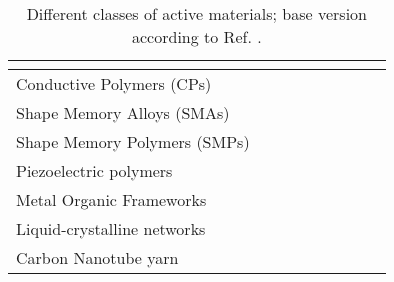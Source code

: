 \documentclass{article}
\begin{document}
\begin{landscape}
\begin{table}[htbp]
\begin{tabular}{|p{3.4cm}|p{1.5cm}|p{1.5cm}|p{1.5cm}|p{1.5cm}|p{1.5cm}|p{1.5cm}|p{1.5cm}|p{1.5cm}|}
			&  \cellcolor{myLightGray} \cite{Maehlich2023jimss,Li2019,Zari2024,Suzuki1990,Kim2010,Truong2018,Sumaru2006}
			&  \cellcolor{myLightGray} \cite{Leichsenring2017,EsserKahn2008,Li2005} 
			&  \cellcolor{myLightGray} \cite{Pu2024,Herrmann2021,Pedrosa2011,Nishat2022,Kim2013,Murakami2005,Erfkamp2019,Miyata2002,Nguyen2018,Gaziano2024} %
			&  \cellcolor{myLightGray} \cite{Yan2018,Kroh2018,Soppimath2001,Zhang2012,Krause2016,MacKenna2015,ManaviTehrani2010} %
			&  \cellcolor{myLightGray} \cite{Bellmann2015,Luo2023,Lv2018,Tellis2011} \\
			\hline
			Conductive Polymers (CPs)
			& 
			& \cellcolor{myLightGray} \cite{Otero1998,Otero2012,He2014,Baughman1996,Madden2002,Smela1993}
			& 
			&  
			&  
			&  
			&  
			&  \\
			\hline
			Shape Memory Alloys (SMAs)
			& \cellcolor{myLightGray} \cite{Wang2017,Sofla2008,Tadaki1988,Jani2014,Seelecke2004,Sun2012}
			& 
			& \cite{Faran2015}
			& \cite{Herath2020} %
			& 
			&  
			&  
			&  \\
			\hline
			Shape Memory Polymers (SMPs)
			& \cellcolor{myLightGray} \cite{Luo2024,Jang2021,Wang2022}
			& 
			& 
			&  
			&  
			&  
			&  
			& \cite{Venkatesan2019,Chen2009}  \\
			\hline
					\raggedright Piezoelectric polymers
			& \cellcolor{myLightGray}  \cite{Liu2007}
			& 
			& 
			& 
			& 
			&  
			&  
			& \\
			\hline
			\raggedright Metal Organic Frameworks
			& 
			& 
			& 
			& 
			& \cellcolor{myLightGray}  \cite{Krause2016a}
			&  
			&  
			& \cite{Li2024} \\
			\hline
			\raggedright Liquid-crystalline networks
			& \cite{Rousseau2003,Thomsen2001,Ware2015}
			& \cite{Lehmann2001,Huang2003}
			& \cite{Feng2023}
			& \cellcolor{myLightGray}  \cite{Lu2018,DaCunha2019,Lan2020,Yang2006}
			& 
			&  
			&  \cite{Cho2006}
			& \cite{Hu2020,Cho2006} \\
			\hline
			\raggedright Carbon Nanotube yarn
			& 
			& \cite{Lima2012}
			& 
			& \cite{Lima2012}
			& \cite{Lima2012}
			& 
			&  
			&  \\
			\hline
		\end{tabular}
		\caption{Different classes of active materials; base version according to Ref. \cite{Ehrenhofer2026shapes_review}.}
		\label{tab:active_materials}
	\end{table}
\end{landscape}
	

\clearpage
\end{document}
